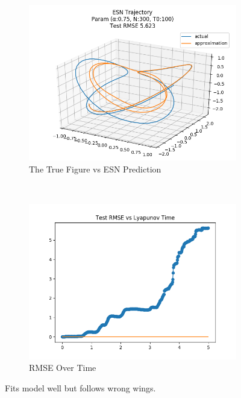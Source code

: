 \documentclass{article}
\begin{document}
\begin{figure}[H]
    \centering
    \begin{subfigure}[b]{0.45\textwidth}
        \includegraphics[width=\textwidth]{doc/paper/images/lorenz/rank_3_param_151_fit.png}
        \caption{The True Figure vs ESN Prediction}
        \label{fig:lorenz_r3_fit}
    \end{subfigure}
    ~
    \begin{subfigure}[b]{0.45\textwidth}
        \includegraphics[width=\textwidth]{doc/paper/images/lorenz/rank_3_param_151_rmse.png}
        \caption{RMSE Over Time}
        \label{fig:lorenz_r3_rmse}
    \end{subfigure}
    \caption{Fits model well but follows wrong wings.}
    \label{fig:lorenz_r3}
\end{figure}
\end{document}
